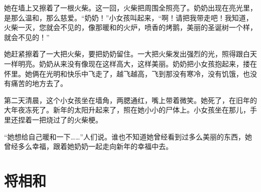 \documentclass[12pt,UTF-8,openany]{ctexbook}
\begin{document}
\begin{large}
    她在墙上又擦着了一根火柴。这一回，火柴把周围全照亮了。奶奶出现在亮光里，是那么温和，那么慈爱。“奶奶！”小女孩叫起来，“啊！请把我带走吧！我知道，火柴一灭，您就会不见的，像那暖和的火炉，喷香的烤鹅，美丽的圣诞树一个样，就会不见的！”
    
    她赶紧擦着了一大把火柴，要把奶奶留住。一大把火柴发出强烈的光，照得跟白天一样明亮。奶奶从来没有像现在这样高大，这样美丽。奶奶把小女孩抱起来，搂在怀里。她俩在光明和快乐中飞走了，越飞越高，飞到那没有寒冷，没有饥饿，也没有痛苦的地方去了。
    
    第二天清晨，这个小女孩坐在墙角，两腮通红，嘴上带着微笑。她死了，在旧年的大年夜冻死了。新年的太阳升起来了，照在她小小的尸体上。小女孩坐在那儿，手里还捏着一把烧过了的火柴梗。
    
    “她想给自己暖和一下……”人们说。谁也不知道她曾经看到过多么美丽的东西，她曾经多么幸福，跟着她奶奶一起走向新年的幸福中去。
    
\end{large}



\chapter{将相和}
\end{document}
